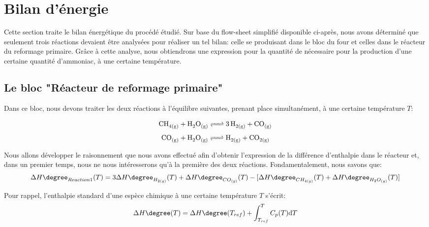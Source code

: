
\section{Bilan d'énergie}

Cette section traite le bilan énergétique du procédé étudié.
Sur base du flow-sheet simplifié disponible ci-après, nous avons déterminé que seulement trois réactions
devaient être analysées pour réaliser un tel bilan: celle se produisant dans le bloc du four et celles dans 
le réacteur du reformage primaire. Grâce à cette analyse, nous obtiendrons une expression pour la quantité de  nécessaire pour la production d'une certaine quantité d'ammoniac, à une certaine température.

\subsection{Le bloc "Réacteur de reformage primaire"}

Dans ce bloc, nous devons traiter les deux réactions à l'équilibre suivantes, prenant place simultanément, à une certaine température $T$:

\begin{equation}\label{eq:Reaction1}
\ce{CH_{4(g)} + H_{2}O_{(g)} <=> 3H_{2(g)} + CO_{(g)}}
\end{equation}
\begin{equation}\label{eq:Reaction2} {\ce{CO_{(g)} + H_{2}O_{(g)} <=>  H_{2(g)} + CO_{2(g)}}}
\end{equation}


\bigbreak
Nous allons développer le raisonnement que nous avons effectué afin d'obtenir l'expression de la différence d'enthalpie dans le réacteur et, dans un premier temps, nous ne nous intéresserons qu'à la première des deux réactions. Fondamentalement, nous savons que:
$$\Delta H\degree_{Reaction1}(T)=3\Delta H\degree_{H_{2(g)}}(T) + \Delta H\degree_{CO_{(g)}}(T) -
\lbrack\Delta H\degree_{CH_{4(g)}}(T) + \Delta H\degree_{H_{2}O_{(g)}}(T)\rbrack$$

Pour rappel, l'enthalpie standard d'une espèce chimique à une certaine température $T$ s'écrit: \begin{equation}\label{eq:deltaH}
\Delta H\degree(T)=\Delta H\degree(T_{ref})  + \displaystyle \int_{T_{ref}}^{T} C_{p}(T) \mathrm{d}T
\end{equation}



